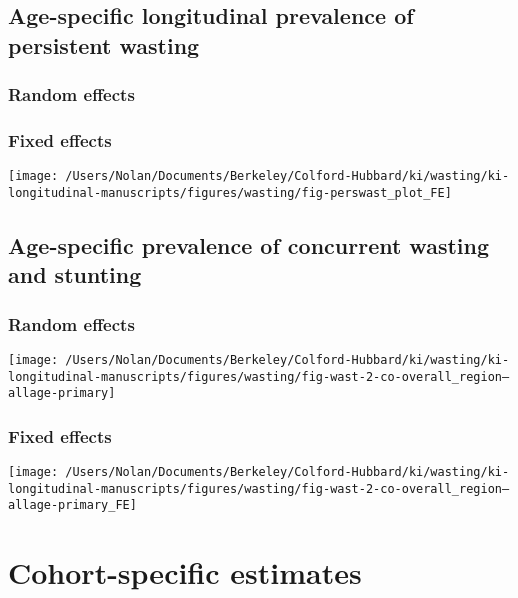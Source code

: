 \documentclass[9pt,]{book}
\begin{document}
\section{Age-specific longitudinal prevalence of persistent
wasting}\label{age-specific-longitudinal-prevalence-of-persistent-wasting}

\subsection{Random effects}\label{random-effects-5}

\subsection{Fixed effects}\label{fixed-effects-5}

\texttt{[image: /Users/Nolan/Documents/Berkeley/Colford-Hubbard/ki/wasting/ki-longitudinal-manuscripts/figures/wasting/fig-perswast\_plot\_FE]}

\section{Age-specific prevalence of concurrent wasting and
stunting}\label{age-specific-prevalence-of-concurrent-wasting-and-stunting}

\subsection{Random effects}\label{random-effects-6}

\texttt{[image: /Users/Nolan/Documents/Berkeley/Colford-Hubbard/ki/wasting/ki-longitudinal-manuscripts/figures/wasting/fig-wast-2-co-overall\_region--allage-primary]}

\subsection{Fixed effects}\label{fixed-effects-6}

\texttt{[image: /Users/Nolan/Documents/Berkeley/Colford-Hubbard/ki/wasting/ki-longitudinal-manuscripts/figures/wasting/fig-wast-2-co-overall\_region--allage-primary\_FE]}

\chapter{Cohort-specific estimates}\label{cohort}

\raggedright
\end{document}

